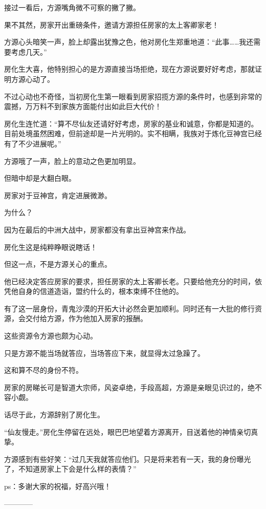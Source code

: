 \begin{this_body}
接过一看后，方源嘴角微不可察的撇了撇。

果不其然，房家开出重磅条件，邀请方源担任房家的太上客卿家老！

方源心头暗笑一声，脸上却露出犹豫之色，他对房化生郑重地道：“此事……我还需要考虑几天。”

房化生大喜，他特别担心的是方源直接当场拒绝，现在方源说要好好考虑，那就证明方源心动了。

不过心动也不奇怪，当初房化生第一眼看到房家招揽方源的条件时，也感到非常的震撼，万万料不到家族方面能付出如此巨大代价！

房化生连忙道：“算不尽仙友还请好好考虑，房家的基业和诚意，你都是知道的。目前处境虽然困难，但前途却是一片光明的。实不相瞒，我族对于炼化豆神宫已经有了不少进展呢。”

方源哦了一声，脸上的意动之色更加明显。

但暗中却是大翻白眼。

房家对于豆神宫，肯定进展微渺。

为什么？

因为在最后的中洲大战中，房家都没有拿出豆神宫来作战。

房化生这是纯粹睁眼说瞎话！

但这一点，不是方源关心的重点。

他已经决定答应房家的要求，担任房家的太上客卿长老。只要给他充分的时间，依凭他自身的信道造诣，盟约什么的，根本束缚不住他的。

有了这一层身份，青鬼沙漠的开拓大计必然会更加顺利。同时还有一大批的修行资源，会交付给方源，作为他加入房家的报酬。

这些资源令方源也颇为心动。

只是方源不能当场就答应，当场答应下来，就显得太过急躁了。

这和算不尽的身份不符。

房家的房睇长可是智道大宗师，风姿卓绝，手段高超，方源是亲眼见识过的，绝不容小觑。

话尽于此，方源辞别了房化生。

“仙友慢走。”房化生停留在远处，眼巴巴地望着方源离开，目送着他的神情亲切真挚。

方源感到有些好笑：“过几天我就答应他们。只是将来若有一天，我的身份曝光了，不知道房家上下会是什么样的表情？”

ps：多谢大家的祝福，好高兴哦！

------------

\end{this_body}

